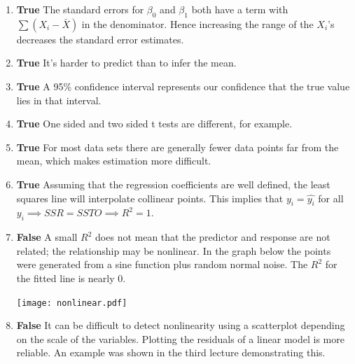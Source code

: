 \documentclass[12pt]{article}
\begin{document}
\begin{enumerate}[label=\alph*]
\item \textbf{True} The standard errors for $\beta_0$ and $\beta_1$ both
have a term with $\sum (X_i - \bar{X})$ in the denominator. Hence increasing the
range of the $X_i$'s decreases the standard error estimates.

\item \textbf{True} It's harder to predict than to infer the mean.

\item \textbf{True} A 95\% confidence interval represents our confidence that
the true value lies in that interval.

\item \textbf{True} One sided and two sided t tests are different, for
example.

\item \textbf{True} For most data sets there are generally fewer data points far from the mean,
which makes estimation more difficult. 

\item \textbf{True} Assuming that the regression coefficients are well 
defined, the least squares line will interpolate collinear points. This
implies that $y_i = \hat{y_i}$ for all $y_i \implies SSR = SSTO \implies R^2 = 1$.

\item \textbf{False} A small $R^2$ does not mean that the predictor and
response are not related; the relationship may be nonlinear. In the graph
below the points were generated from a sine function plus random normal
noise. The $R^2$ for the fitted line is nearly 0.

\centerline{\texttt{[image: nonlinear.pdf]}}

\item \textbf{False} It can be difficult to detect nonlinearity using a
scatterplot depending on the  scale of the variables.
Plotting the residuals of a linear model is more reliable.
An example was shown in the third lecture demonstrating this.

\end{enumerate}
\end{document}
